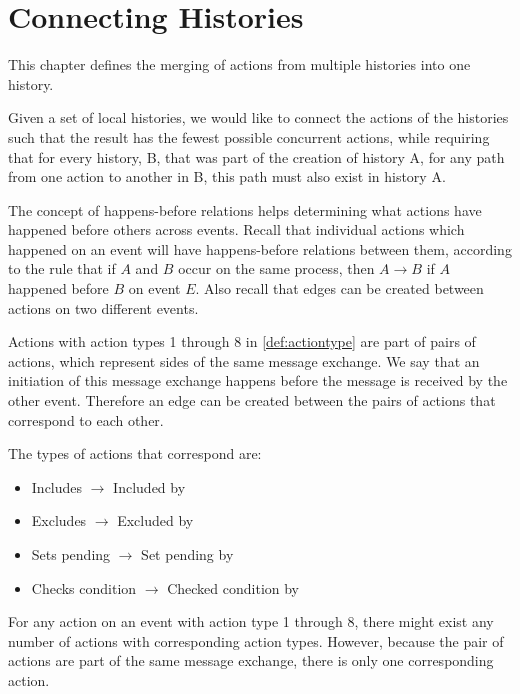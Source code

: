 \chapter{Connecting Histories} 
\label{chap:connecting-histories}
	This chapter defines the merging of actions from multiple histories into one history.
	
    \newpar
    Given a set of local histories, we would like to connect the actions of the histories such that the result has the fewest possible concurrent actions, while requiring that for every history, B, that was part of the creation of history A, for any path from one action to another in B, this path must also exist in history A.
    
    \newpar
    The concept of happens-before relations helps determining what actions have happened before others across events. Recall that individual actions which happened on an event will have happens-before relations between them, according to the rule that if $A$ and $B$ occur on the same process, then $A \rightarrow B$ if $A$ happened before $B$ on event $E$.
	Also recall that edges can be created between actions on two different events.
	
    \newpar
	Actions with action types 1 through 8 in \autoref{def:actiontype} are part of pairs of actions, which represent sides of the same message exchange. We say that an initiation of this message exchange happens before the message is received by the other event. Therefore an edge can be created between the pairs of actions that correspond to each other.
	
	\begin{definition}
		The types of actions that correspond are:
			\begin{itemize}
				\item Includes $\rightarrow$ Included by
				\item Excludes $\rightarrow$ Excluded by
				\item Sets pending $\rightarrow$ Set pending by
				\item Checks condition $\rightarrow$ Checked condition by
			\end{itemize}
			\label{def:happensbeforeaction}
	\end{definition}
	

	\newpar For any action on an event with action type 1 through 8, there might exist any number of actions with corresponding action types. However, because the pair of actions are part of the same message exchange, there is only one corresponding action.
	

